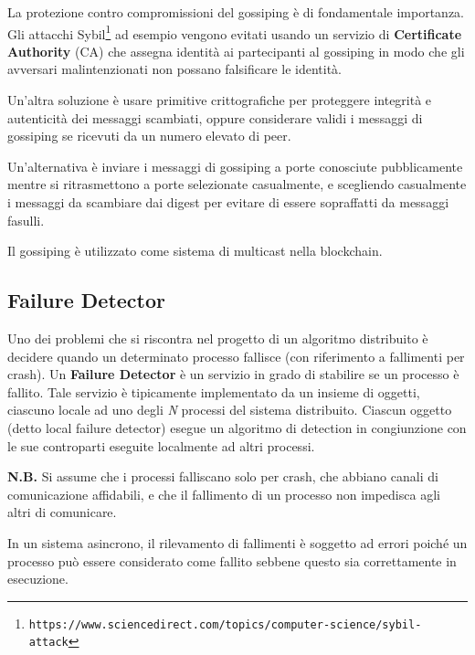 La protezione contro compromissioni del gossiping è di fondamentale importanza. Gli attacchi Sybil\footnote{\texttt{https://www.sciencedirect.com/topics/computer-science/sybil-attack}} ad esempio vengono evitati usando un servizio di \textbf{Certificate Authority} (CA) che assegna identità ai partecipanti al gossiping in modo che gli avversari malintenzionati non possano falsificare le identità.

Un'altra soluzione è usare primitive crittografiche per proteggere integrità e autenticità dei messaggi scambiati, oppure considerare validi i messaggi di gossiping se ricevuti da un numero elevato di peer.

Un'alternativa è inviare i messaggi di gossiping a porte conosciute pubblicamente mentre si ritrasmettono a porte selezionate casualmente, e scegliendo casualmente i messaggi da scambiare dai digest per evitare di essere sopraffatti da messaggi fasulli.

Il gossiping è utilizzato come sistema di multicast nella blockchain.

\subsection{Failure Detector}
Uno dei problemi che si riscontra nel progetto di un algoritmo distribuito è decidere quando un determinato processo fallisce (con riferimento a fallimenti per crash). Un \textbf{Failure Detector} è un servizio in grado di stabilire se un processo è fallito. Tale servizio è tipicamente implementato da un insieme di oggetti, ciascuno locale ad uno degli \textit{N} processi del sistema distribuito. Ciascun oggetto (detto local failure detector) esegue un algoritmo di detection in congiunzione con le sue controparti eseguite localmente ad altri processi.

\textbf{N.B.} Si assume che i processi falliscano solo per crash, che abbiano canali di comunicazione affidabili, e che il fallimento di un processo non impedisca agli altri di comunicare.

\vspace{5mm}

In un sistema asincrono, il rilevamento di fallimenti è soggetto ad errori poiché un processo può essere considerato come fallito sebbene questo sia correttamente in esecuzione.

